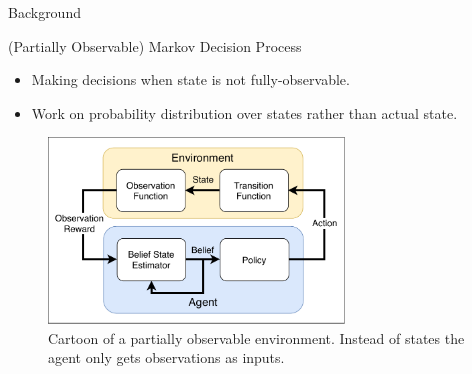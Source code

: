 \begin{exampleblock}{Background}
\begin{figure}[htp]
\end{figure}


\Large{(Partially Observable) Markov Decision Process}

\normalsize
\begin{itemize}
    \item Making decisions when state is not fully-observable.
    \item Work on probability distribution over states rather than actual state.
\end{itemize}

\hspace{2cm}


\begin{figure}
  \centering
    \includegraphics[width=0.7\textwidth]{img/background/POMDP}
  \caption{Cartoon of a partially observable environment. Instead of states the agent only gets observations as inputs.}
\end{figure}






\end{exampleblock}

